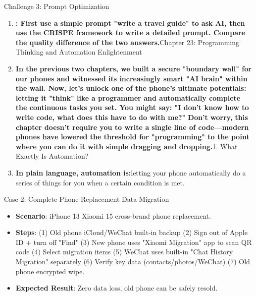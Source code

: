 \begin{tcbpractice}{Challenge 3: Prompt Optimization}
\begin{enumerate}
  \item \textbf{: First use a simple prompt "write a travel guide" to ask AI, then use the CRISPE framework to write a detailed prompt. Compare the quality difference of the two answers.}Chapter 23: Programming Thinking and Automation Enlightenment
  \item \textbf{In the previous two chapters, we built a secure "boundary wall" for our phones and witnessed its increasingly smart "AI brain" within the wall. Now, let's unlock one of the phone's ultimate potentials: letting it "think" like a programmer and automatically complete the continuous tasks you set. You might say: "I don't know how to write code, what does this have to do with me?" Don't worry, this chapter doesn't require you to write a single line of code—modern phones have lowered the threshold for "programming" to the point where you can do it with simple dragging and dropping.}1. What Exactly Is Automation?
  \item \textbf{In plain language, automation is:}letting your phone automatically do a series of things for you when a certain condition is met.
\end{enumerate}

\end{tcbpractice}

\begin{tcbinfo}{Case 2: Complete Phone Replacement Data Migration}
\begin{itemize}
  \item \textbf{Scenario}: iPhone 13 Xiaomi 15 cross-brand phone replacement.
  \item \textbf{Steps}: (1) Old phone iCloud/WeChat built-in backup (2) Sign out of Apple ID + turn off "Find" (3) New phone uses "Xiaomi Migration" app to scan QR code (4) Select migration items (5) WeChat uses built-in "Chat History Migration" separately (6) Verify key data (contacts/photos/WeChat) (7) Old phone encrypted wipe.
  \item \textbf{Expected Result}: Zero data loss, old phone can be safely resold.
\end{itemize}

\end{tcbinfo}
